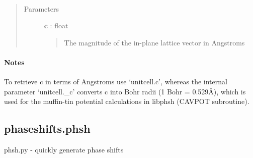 \documentclass[letterpaper,10pt,english]{sphinxmanual}
\begin{document}
\begin{fulllineitems}
\begin{fulllineitems}
\label{modules:phaseshifts.model.Unitcell.set_c}~\begin{quote}\begin{description}
\item[{Parameters}] \leavevmode
\textbf{c} : float
\begin{quote}

The magnitude of the in-plane lattice vector in Angstroms
\end{quote}

\end{description}\end{quote}
\paragraph{Notes}

To retrieve c in terms of Angstroms use `unitcell.c', whereas the
internal parameter `unitcell.\_c' converts c into Bohr radii 
(1 Bohr = 0.529Å), which is used for the muffin-tin potential
calculations in libphsh (CAVPOT subroutine).

\end{fulllineitems}


\begin{fulllineitems}
\label{modules:phaseshifts.model.Unitcell.set_gamma}
\end{fulllineitems}


\begin{fulllineitems}
\label{modules:phaseshifts.model.Unitcell.set_vectors}
\end{fulllineitems}


\end{fulllineitems}



\subsection{phaseshifts.phsh}
\label{modules:phaseshifts-phsh}\label{modules:module-phaseshifts.phsh}
phsh.py - quickly generate phase shifts
\end{document}
